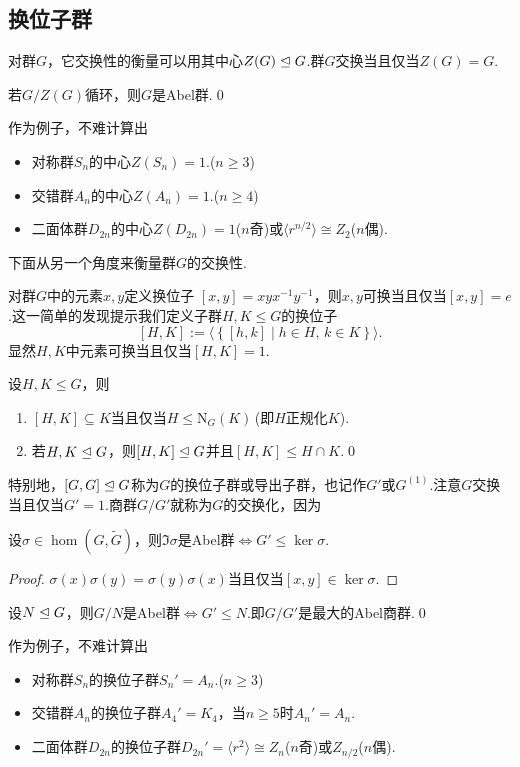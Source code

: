 \subsection{换位子群}
对群$G$，它交换性的衡量可以用其中心$Z(G)\trianglelefteq G$.群$G$交换当且仅当$Z(G)=G$.
\begin{prop}
	若$G/Z(G)$循环，则$G$是Abel群.\qed
\end{prop}

作为例子，不难计算出
\begin{itemize}
	\item 对称群$S_n$的中心$Z(S_n)=1$.($n\ge 3$)
	\item 交错群$A_n$的中心$Z(A_n)=1$.($n\ge 4$)
	\item 二面体群$D_{2n}$的中心$Z(D_{2n})=1$($n$奇)或$\langle r^{n/2}\rangle \cong Z_2$($n$偶).
\end{itemize}

下面从另一个角度来衡量群$G$的交换性.

对群$G$中的元素$x,y$定义{\heiti 换位子} $[x,y]=xyx^{-1}y^{-1}$，则$x,y$可换当且仅当$[x,y]=e$.这一简单的发现提示我们定义子群$H,K\le G$的{\heiti 换位子}
\[
	[H,K]:=\langle \left\{[h,k]\mid h\in H,\,k\in K\right\}\rangle .
\]
显然$H,K$中元素可换当且仅当$[H,K]=1$.
\begin{lemma}
	设$H,K\le G$，则
	\begin{enumerate}
		\item $[H,K]\subseteq K$当且仅当$H\le\mathrm{N}_G(K)$\,(即$H$正规化$K$).
		\item 若$H,K\trianglelefteq G$，则$[H,K]\trianglelefteq G$并且$[H,K]\le H\cap K$.\qed
	\end{enumerate}
\end{lemma}

特别地，$[G,G]\trianglelefteq G$称为$G$的{\heiti 换位子群}或{\heiti 导出子群}，也记作$G'$或$G^{(1)}$.注意$G$交换当且仅当$G'=1$.商群$G/G'$就称为$G$的{\heiti 交换化}，因为\hypertarget{text:Abelianization}{}
\begin{prop}
	设$\sigma\in\hom(G,\tilde{G})$，则$\Im\sigma$是Abel群$\iff G'\le\ker\sigma$.
\end{prop}
\begin{proof}
	$\sigma(x)\sigma(y)=\sigma(y)\sigma(x)$当且仅当$[x,y]\in\ker\sigma$.
\end{proof}
\begin{cor*}
	设$N\trianglelefteq G$，则$G/N$是Abel群$\iff G'\le N$.即$G/G'$是最大的Abel商群.\qed
\end{cor*}

作为例子，不难计算出
\begin{itemize}
	\item 对称群$S_n$的换位子群$S_n'=A_n$.($n\ge 3$)
	\item 交错群$A_n$的换位子群$A_4'=K_4$，当$n\ge 5$时$A_n'=A_n$.
	\item 二面体群$D_{2n}$的换位子群$D_{2n}'=\langle r^2\rangle\cong Z_n$($n$奇)或$Z_{n/2}$($n$偶).
\end{itemize}

